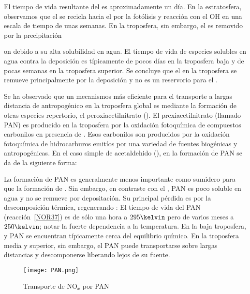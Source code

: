 El tiempo de vida resultante del  es aproximadamente un día. En la estratosfera, observamos que el  se recicla hacia el  por la fotólisis y reacción con el OH en una escala de tiempo de unas semanas. En la troposfera, sin embargo, el  es removido por la precipitación{on debido a su alta solubilidad en agua. El tiempo de vida de especies solubles en agua contra la deposición es típicamente de pocos días en la troposfera baja y de pocas semanas en la troposfera superior. Se concluye que el  en la troposfera se remueve principalmente por la deposición y no es un reservorio para el .

Se ha observado que un mecanismos más eficiente para el transporte a largas distancia de  antropogénico en la troposfera global es mediante la formación de otras especies repertorio, el peroxiacetilnitrato (). El prexiacetilnitrato (llamado PAN) es producido en la troposfera por la oxidación fotoquímica de compuestos carbonilos en presencia de . Esos carbonilos son producidos por la oxidación fotoquímica de hidrocarburos emitíos por una variedad de fuentes biogénicas y antropogénicas. En el caso simple de acetaldehido (), en la formación de PAN se da de la siguiente forma:


La formación de PAN es generalmente menos importante como sumidero para   que la formación de . Sin embargo, en contraste con el , PAN es poco soluble en agua y no se remueve por depositación. Su principal pérdida es por la descomposición térmica, regenerando  :
El tiempo de vida del PAN (reacción~\ref{NOR37}) es de sólo una hora a $295\kelvin$ pero de varios meses a $250\kelvin$; notar la fuerte dependencia a la temperatura. En la baja troposfera,   y PAN se encuentran típicamente cerca del equilibrio químico. En la troposfera media y superior, sin embargo, el PAN puede transportarse sobre largas distancias y descomponerse liberando   lejos de su fuente.
\begin{figure}[htbp]
\begin{center}
\texttt{[image: PAN.png]}
\caption{Transporte de NO$_x$ por PAN}
\label{noxpan}
\end{center}
\end{figure}

}
